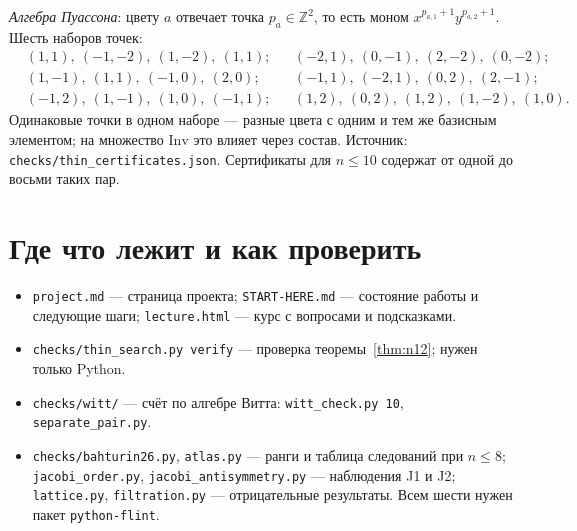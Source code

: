 \documentclass[11pt]{article}
\newcommand{\Inv}{\mathrm{Inv}}
\newcommand{\Z}{\mathbb Z}
\theoremstyle{plain}
\theoremstyle{definition}
\theoremstyle{remark}
\begin{document}
\emph{Алгебра Пуассона}: цвету $a$ отвечает точка $p_a\in\Z^2$, то есть моном $x^{p_{a,1}+1}y^{p_{a,2}+1}$. Шесть наборов точек:
\begin{align*}
&(1,1),\ (-1,-2),\ (1,-2),\ (1,1); &&(-2,1),\ (0,-1),\ (2,-2),\ (0,-2);\\
&(1,-1),\ (1,1),\ (-1,0),\ (2,0); &&(-1,1),\ (-2,1),\ (0,2),\ (2,-1);\\
&(-1,2),\ (1,-1),\ (1,0),\ (-1,1); &&(1,2),\ (0,2),\ (1,2),\ (1,-2),\ (1,0).
\end{align*}
Одинаковые точки в одном наборе --- разные цвета с одним и тем же базисным элементом; на множество $\Inv$ это влияет через состав. Источник: \texttt{checks/thin\_certificates.json}. Сертификаты для $n\le10$ содержат от одной до восьми таких пар.

\section{Где что лежит и как проверить}

\begin{itemize}
\item \texttt{project.md} --- страница проекта; \texttt{START-HERE.md} --- состояние работы и следующие шаги; \texttt{lecture.html} --- курс с вопросами и подсказками.
\item \texttt{checks/thin\_search.py verify} --- проверка теоремы~\ref{thm:n12}; нужен только Python.
\item \texttt{checks/witt/} --- счёт по алгебре Витта: \texttt{witt\_check.py 10}, \texttt{separate\_pair.py}.
\item \texttt{checks/bahturin26.py}, \texttt{atlas.py} --- ранги и таблица следований при $n\le8$; \texttt{jacobi\_order.py}, \texttt{jacobi\_antisymmetry.py} --- наблюдения J1 и J2; \texttt{lattice.py}, \texttt{filtration.py} --- отрицательные результаты. Всем шести нужен пакет \texttt{python-flint}.
\end{itemize}
\end{document}
